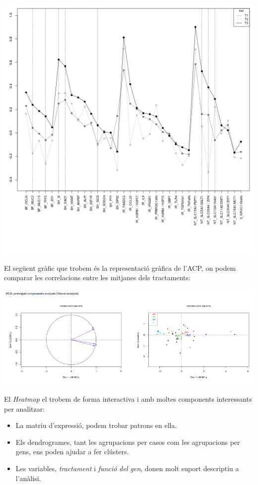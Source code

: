 \documentclass[english]{article}
\begin{document}
\begin{center}
\includegraphics[scale=0.4]{app9.png}
\end{center}
\clearpage
El següent gràfic que trobem és la representació gràfica de l'ACP, on podem comparar les correlacions entre les mitjanes dels tractaments:
\begin{center}
\includegraphics[scale=0.5]{app5.png}
\end{center}
El \textit{Heatmap} el trobem de forma interactiva i amb moltes components interessants per analitzar:
\begin{itemize}
\item La matriu d'expressió, podem trobar patrons en ella.
\item Els dendrogrames, tant les agrupacions per casos com les agrupacions per gens, ens poden ajudar a fer clústers.
\item Les variables, \textit{tractament} i \textit{funció del gen}, donen molt suport descriptiu a l'anàlisi.
\end{itemize}
\end{document}
